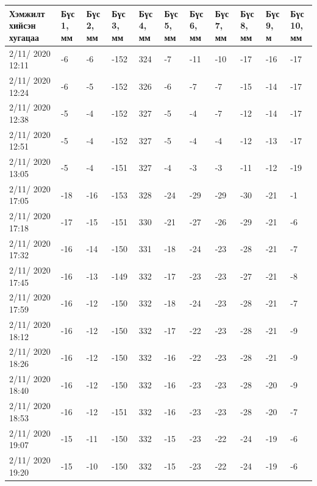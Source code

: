 \begin{table}[h]
    \centering
    \begin{tabular}{|p{1.5cm}|p{0.8cm}|p{0.8cm}|p{0.8cm}|p{0.8cm}|p{0.8cm}|p{0.8cm}|p{0.8cm}|p{0.8cm}|p{0.8cm}|p{0.8cm}|}
         \hline
     Хэмжилт хийсэн хугацаа & Бүс 1, мм&	Бүс 2, мм&	Бүс 3, мм&	Бүс 4, мм&	Бүс 5, мм&	Бүс 6, мм&	Бүс 7, мм&	Бүс 8, мм&	Бүс 9, м&	Бүс 10, мм \\ \hline
2/11/ 2020 12:11&	-6&	-6&	-152&324&-7&	-11&-10&-17&	-16&	-17 \\ \hline
2/11/ 2020 12:24&	-6&	-5&	-152&326&-6&	-7&	-7&	-15&	-14&	-17 \\ \hline
2/11/ 2020 12:38&	-5&	-4&	-152&327&-5&	-4&	-7&	-12&	-14&	-17 \\ \hline
2/11/ 2020 12:51&	-5&	-4&	-152&327&-5&	-4&	-4&	-12&	-13&	-17 \\ \hline
2/11/ 2020 13:05&	-5&	-4&	-151&327&-4&	-3&	-3&	-11&	-12&	-19 \\ \hline
2/11/ 2020 17:05&	-18&-16&-153&328&-24&	-29&-29&-30&	-21&	-1 \\ \hline
2/11/ 2020 17:18&	-17&-15&-151&330&-21&	-27&-26&-29&	-21&	-6 \\ \hline
2/11/ 2020 17:32&	-16&-14&-150&331&-18&	-24&-23&-28&	-21&	-7 \\ \hline
2/11/ 2020 17:45&	-16&-13&-149&332&-17&	-23&-23&-27&	-21&	-8 \\ \hline
2/11/ 2020 17:59&	-16&-12&-150&332&-18&	-24&-23&-28&	-21&	-7 \\ \hline
2/11/ 2020 18:12&	-16&-12&-150&332&-17&	-22&-23&-28&	-21&	-9 \\ \hline
2/11/ 2020 18:26&	-16&-12&-150&332&-16&	-22&-23&-28&	-21&	-9 \\ \hline
2/11/ 2020 18:40&	-16&-12&-150&332&-16&	-23&-23&-28&	-20&	-9 \\ \hline
2/11/ 2020 18:53&	-16&-12&-151&332&-16&	-23&-23&-28&	-20&	-7 \\ \hline
2/11/ 2020 19:07&	-15&-11&-150&332&-15&	-23&-22&-24&	-19&	-6 \\ \hline
2/11/ 2020 19:20&	-15&-10&-150&332&-15&	-23&-22&-24&	-19&	-6 \\ \hline
    \end{tabular}
\end{table}
